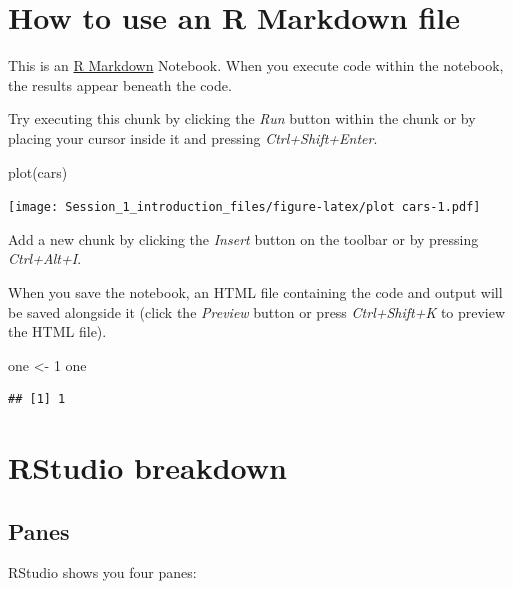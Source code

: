 \documentclass[]{article}
\newenvironment{Shaded}{\begin{snugshade}}{\end{snugshade}}
\newcommand{\DecValTok}[1]{\textcolor[rgb]{0.00,0.00,0.81}{#1}}
\newcommand{\FunctionTok}[1]{\textcolor[rgb]{0.00,0.00,0.00}{#1}}
\newcommand{\NormalTok}[1]{#1}
\newcommand{\OtherTok}[1]{\textcolor[rgb]{0.56,0.35,0.01}{#1}}
\begin{document}
\hypertarget{how-to-use-an-r-markdown-file}{%
\section{How to use an R Markdown
file}\label{how-to-use-an-r-markdown-file}}

This is an \href{http://rmarkdown.rstudio.com}{R Markdown} Notebook.
When you execute code within the notebook, the results appear beneath
the code.

Try executing this chunk by clicking the \emph{Run} button within the
chunk or by placing your cursor inside it and pressing
\emph{Ctrl+Shift+Enter}.

\begin{Shaded}
\begin{Highlighting}[]
\FunctionTok{plot}\NormalTok{(cars)}
\end{Highlighting}
\end{Shaded}

\texttt{[image: Session\_1\_introduction\_files/figure-latex/plot cars-1.pdf]}

Add a new chunk by clicking the \emph{Insert} button on the toolbar or
by pressing \emph{Ctrl+Alt+I}.

When you save the notebook, an HTML file containing the code and output
will be saved alongside it (click the \emph{Preview} button or press
\emph{Ctrl+Shift+K} to preview the HTML file).

\begin{Shaded}
\begin{Highlighting}[]
\NormalTok{one }\OtherTok{\textless{}{-}} \DecValTok{1}
\NormalTok{one}
\end{Highlighting}
\end{Shaded}

\begin{verbatim}
## [1] 1
\end{verbatim}

\hypertarget{rstudio-breakdown}{%
\section{RStudio breakdown}\label{rstudio-breakdown}}

\hypertarget{panes}{%
\subsection{Panes}\label{panes}}

RStudio shows you four panes:
\end{document}

